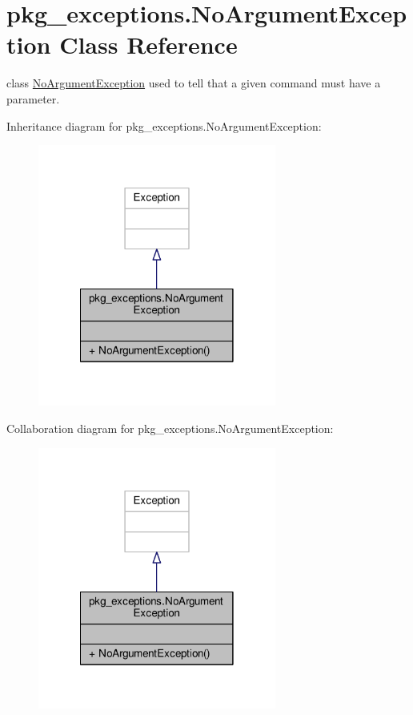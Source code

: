 \hypertarget{classpkg__exceptions_1_1NoArgumentException}{\section{pkg\-\_\-exceptions.\-No\-Argument\-Exception Class Reference}
\label{classpkg__exceptions_1_1NoArgumentException}
}


class \hyperlink{classpkg__exceptions_1_1NoArgumentException}{No\-Argument\-Exception} used to tell that a given command must have a parameter.  




Inheritance diagram for pkg\-\_\-exceptions.\-No\-Argument\-Exception\-:\nopagebreak
\begin{figure}[H]
\begin{center}
\leavevmode
\includegraphics[width=222pt]{classpkg__exceptions_1_1NoArgumentException__inherit__graph}
\end{center}
\end{figure}


Collaboration diagram for pkg\-\_\-exceptions.\-No\-Argument\-Exception\-:\nopagebreak
\begin{figure}[H]
\begin{center}
\leavevmode
\includegraphics[width=222pt]{classpkg__exceptions_1_1NoArgumentException__coll__graph}
\end{center}
\end{figure}

